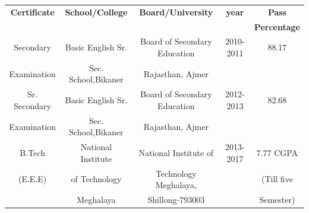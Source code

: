 \documentclass{article}
\begin{document}
	\begin{tabular}{|c|c|c|c|c|}
		\hline
		\textbf{Certificate} & \textbf{School/College} & \textbf{Board/University} &  \textbf{year} & \textbf{Pass}   \\
		&        &            &              & \textbf{Percentage}\\
		\hline
		
		Secondary & Basic English Sr. & Board of Secondary Education & 2010-2011 &88.17 \\
		Examination&Sec. School,Bikaner & Rajasthan, Ajmer& & \\
		\hline
		Sr. Secondary & Basic English Sr. & Board of Secondary Education & 2012-2013 &82.68 \\
		Examination&Sec. School,Bikaner & Rajasthan, Ajmer& & \\
		\hline
		B.Tech & National Institute & National Institute of  & 2013-2017 &7.77 CGPA\\
		(E.E.E)	&of Technology &Technology Meghalaya, & &(Till five \\
		& Meghalaya &Shillong-793003& &Semester) \\
		\hline
	\end{tabular}
	
	
\end{document}
